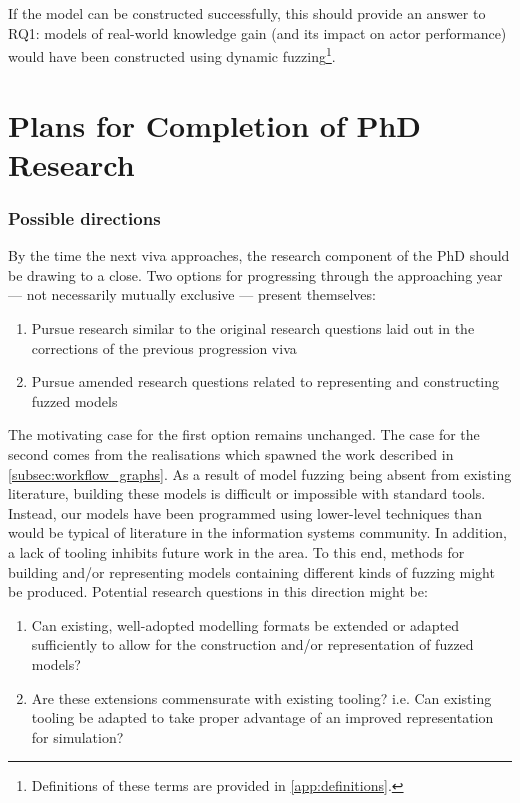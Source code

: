 \documentclass[11pt]{article}
\begin{document}
If the model can be constructed successfully, this should provide an answer to
RQ1: models of real-world knowledge gain (and its impact on actor performance)
would have been constructed using dynamic fuzzing\footnote{Definitions of these terms
are provided in \cref{app:definitions}.}.



\part{Plans for Completion of PhD Research}
\label{part:future_work}

\section{Possible directions}
\label{sec:orgd5cde00}

By the time the next viva approaches, the research component of the PhD should
be drawing to a close. Two options for progressing through the approaching year
--- not necessarily mutually exclusive --- present themselves:

\begin{enumerate}
\item Pursue research similar to the original research questions laid out in the
corrections of the previous progression viva
\item Pursue amended research questions related to representing and constructing
fuzzed models
\end{enumerate}

The motivating case for the first option remains unchanged. The case for the
second comes from the realisations which spawned the work described in
\cref{subsec:workflow_graphs}. As a result of model fuzzing being absent from
existing literature, building these models is difficult or impossible with
standard tools. Instead, our models have been programmed using lower-level
techniques than would be typical of literature in the information systems
community. In addition, a lack of tooling inhibits future work in the area. To
this end, methods for building and/or representing models containing different
kinds of fuzzing might be produced. Potential research questions in this
direction might be:

\begin{enumerate}
\item Can existing, well-adopted modelling formats be extended or adapted
sufficiently to allow for the construction and/or representation of fuzzed
models?
\item Are these extensions commensurate with existing tooling? i.e. Can existing
tooling be adapted to take proper advantage of an improved representation for
simulation?
\end{enumerate}
\end{document}
